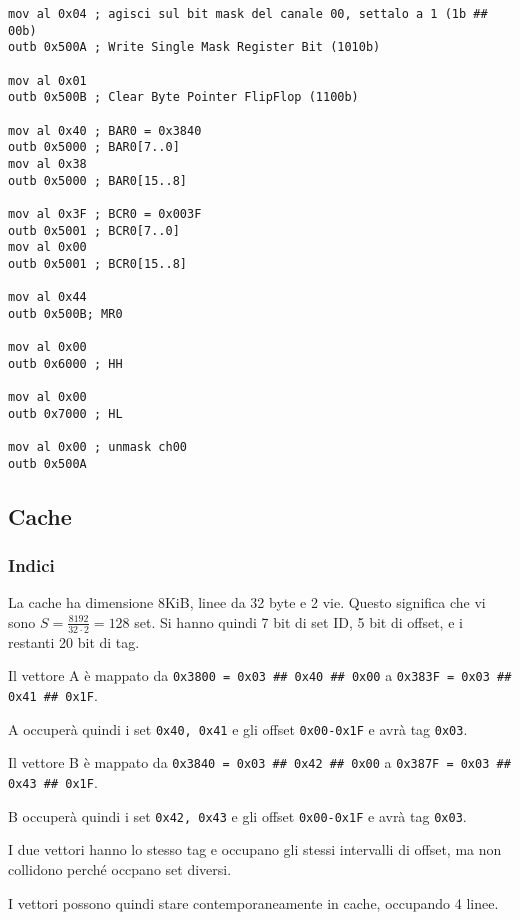 \documentclass[a4paper]{article}
\begin{document}
\begin{verbatim}
mov al 0x04 ; agisci sul bit mask del canale 00, settalo a 1 (1b ## 00b)
outb 0x500A ; Write Single Mask Register Bit (1010b)

mov al 0x01
outb 0x500B ; Clear Byte Pointer FlipFlop (1100b)

mov al 0x40 ; BAR0 = 0x3840
outb 0x5000 ; BAR0[7..0]
mov al 0x38
outb 0x5000 ; BAR0[15..8]

mov al 0x3F ; BCR0 = 0x003F
outb 0x5001 ; BCR0[7..0]
mov al 0x00 
outb 0x5001 ; BCR0[15..8]

mov al 0x44
outb 0x500B; MR0

mov al 0x00
outb 0x6000 ; HH

mov al 0x00
outb 0x7000 ; HL

mov al 0x00 ; unmask ch00
outb 0x500A

\end{verbatim}

\subsection{Cache}
\subsubsection{Indici}
La cache ha dimensione 8KiB, linee da 32 byte e 2 vie. Questo significa che vi sono $S = \frac{8192}{32 \cdot 2} = 128$ set. 
Si hanno quindi 7 bit di set ID, 5 bit di offset, e i restanti 20 bit di tag.

Il vettore A è mappato da \texttt{0x3800 = 0x03 \#\# 0x40 \#\# 0x00} a \texttt{0x383F = 0x03 \#\# 0x41 \#\# 0x1F}.

A occuperà quindi i set \texttt{0x40, 0x41} e gli offset \texttt{0x00-0x1F} e avrà tag \texttt{0x03}.

Il vettore B è mappato da \texttt{0x3840 = 0x03 \#\# 0x42 \#\# 0x00} a \texttt{0x387F = 0x03 \#\# 0x43 \#\# 0x1F}.

B occuperà quindi i set \texttt{0x42, 0x43} e gli offset \texttt{0x00-0x1F} e avrà tag \texttt{0x03}.

I due vettori hanno lo stesso tag e occupano gli stessi intervalli di offset, ma non collidono perché occpano set diversi.

I vettori possono quindi stare contemporaneamente in cache, occupando 4 linee.
\end{document}
